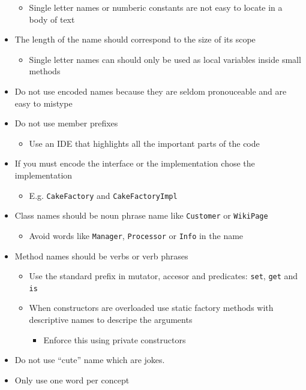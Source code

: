\documentclass[11pt]{article}
\providecommand{\tightlist}{%
      \setlength{\itemsep}{0pt}\setlength{\parskip}{0pt}}
\begin{document}
\begin{itemize}
  \begin{itemize}
  \tightlist
  \item
    Single letter names or numberic constants are not easy to locate in
    a body of text
  \end{itemize}
\item
  The length of the name should correspond to the size of its scope

  \begin{itemize}
  \tightlist
  \item
    Single letter names can should only be used as local variables
    inside small methods
  \end{itemize}
\item
  Do not use encoded names because they are seldom pronouceable and are
  easy to mistype
\item
  Do not use member prefixes

  \begin{itemize}
  \tightlist
  \item
    Use an IDE that highlights all the important parts of the code
  \end{itemize}
\item
  If you must encode the interface or the implementation chose the
  implementation

  \begin{itemize}
  \tightlist
  \item
    E.g. \texttt{CakeFactory} and \texttt{CakeFactoryImpl}
  \end{itemize}
\item
  Class names should be noun phrase name like \texttt{Customer} or
  \texttt{WikiPage}

  \begin{itemize}
  \tightlist
  \item
    Avoid words like \texttt{Manager}, \texttt{Processor} or
    \texttt{Info} in the name
  \end{itemize}
\item
  Method names should be verbs or verb phrases

  \begin{itemize}
  \tightlist
  \item
    Use the standard prefix in mutator, accesor and predicates:
    \texttt{set}, \texttt{get} and \texttt{is}
  \item
    When constructors are overloaded use static factory methods with
    descriptive names to descripe the arguments

    \begin{itemize}
    \tightlist
    \item
      Enforce this using private constructors
    \end{itemize}
  \end{itemize}
\item
  Do not use ``cute'' name which are jokes.
\item
  Only use one word per concept


\end{itemize}
\end{document}
